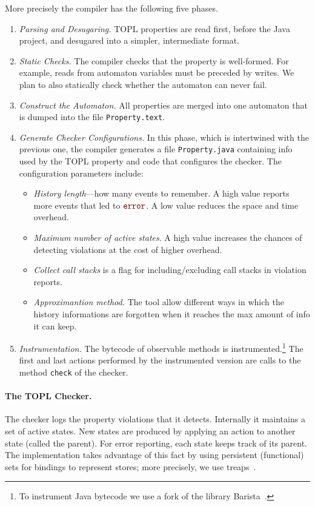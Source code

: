 \documentclass[9pt, preprint]{sigplanconf} %
\newcommand{\noterg}[2]{\textcolor{gray}{[\textcolor{red}{#1}: #2]}}
\newcommand{\dd}[1]{\noterg{dd}{#1}}
\newcommand{\error}{\ensuremath{\textcolor{darkred}{\mathtt{error}}}\xspace}
\theoremstyle{definition}
\theoremstyle{remark}
\begin{document}
More precisely the compiler has the following five phases.
\begin{enumerate}
\item {\em Parsing and Desugaring.}
TOPL properties are read first, before the Java project, and desugared into a simpler, intermediate format. 
\item {\em Static Checks.} The compiler checks that the property is well-formed. For example, reads from automaton variables must be preceded by writes. We plan to also statically check whether the automaton can never fail.
%
\item {\em Construct the Automaton.} All properties are merged into one automaton that is  dumped into the file {\tt Property.text}.
%
\item {\em Generate Checker Configurations.}
In this phase, which is intertwined with the previous one, the compiler generates a file {\tt Property.java} containing 
info used by the TOPL property and code that configures the checker.
The configuration parameters include:
\begin{itemize}
\item \emph{History length}---how many events to remember.
  A high value reports more events that led to \error.
  A low value reduces the space and time overhead.
\item \emph{Maximum number of active states}.
  A high value increases the chances of detecting violations at the cost of higher  overhead.

\item \emph{Collect call stacks} is a flag for including/excluding  call stacks in violation reports.
%
\item {\em Approximantion method.} The tool allow different ways in which the history informations are forgotten when it reaches the max amount of info it can keep.
\end{itemize}
%
\item {\em Instrumentation.}
The bytecode of observable methods is instrumented.\footnote{To instrument Java bytecode we use a fork of the library 
Barista~\cite{barista}.}
The first and last actions performed by the instrumented version are calls to the method {\tt check} of the checker.
\end{enumerate}

\paragraph{The TOPL Checker.} %
The checker logs the property violations that it detects. 
Internally it  maintains a set of active states.
New states are  produced by applying an action to another state (called the parent).
For error reporting, each state keeps track of its parent.
The implementation takes advantage of this fact by using persistent (functional) sets for bindings to represent stores; more precisely, we use treaps~\cite{DBLP:conf/focs/AragonS89}.
%
\end{document}
